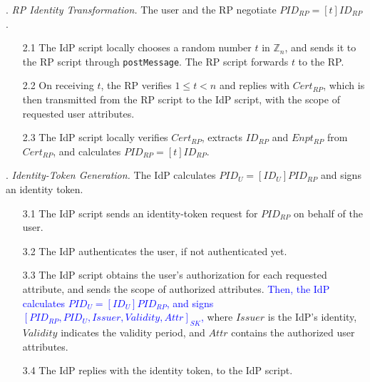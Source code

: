 . {\em RP Identity Transformation.}
The user and the RP negotiate $PID_{RP} = [t]{ID_{RP}}$.
\vspace{-\topsep}
\begin{itemize}
\setlength{\topsep}{0pt}
\setlength{\partopsep}{0pt}
\setlength{\itemsep}{0pt}
\setlength{\parsep}{0pt}
\setlength{\parskip}{0pt}
\item[2.1] The IdP script locally chooses a random number $t$ in $\mathbb{Z}_n$,
 and sends it to the RP script through \verb+postMessage+.
The RP script forwards $t$ to the RP.
\item[2.2] On receiving $t$,
the RP verifies $1 \leq t < n$ and %
 replies with $Cert_{RP}$, which is then transmitted from the RP script to the IdP script,
    with the scope of requested user attributes.  %
\item[2.3] The IdP script locally verifies $Cert_{RP}$, extracts $ID_{RP}$ and $Enpt_{RP}$ from $Cert_{RP}$, and calculates $PID_{RP}=[t]{ID_{RP}}$.

\end{itemize}


. {\em Identity-Token Generation.}
The IdP calculates $PID_U = [ID_U]{PID_{RP}}$ and signs an identity token. %
\vspace{-\topsep}
\begin{itemize}
\setlength{\topsep}{0pt}
\setlength{\partopsep}{0pt}
\setlength{\itemsep}{0pt}
\setlength{\parsep}{0pt}
\setlength{\parskip}{0pt}
\item[3.1]
The IdP script sends an identity-token request for $PID_{RP}$ on behalf of the user. %

\item[3.2] The IdP authenticates the user, if not authenticated yet.

\item [3.3]
The IdP script obtains the user's authorization for each requested attribute,
    and sends the scope of authorized attributes. %
\textcolor{blue}{Then, the IdP %
    calculates $PID_U = [ID_U]{PID_{RP}}$, %
and signs $[PID_{RP}, PID_U, Issuer, Validity, Attr]_{SK}$,}
 where $Issuer$ is the IdP's identity, $Validity$ indicates the validity period, and $Attr$ contains the authorized user attributes.
\item[3.4] The IdP replies with the identity token, to the IdP script.
\end{itemize}


